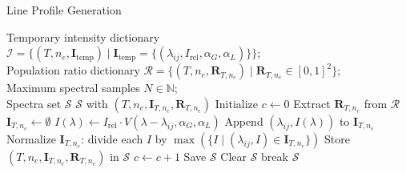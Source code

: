 \begin{algorithm}
\small
\caption{Line Profile Generation}
\begin{algorithmic}[1]
  \REQUIRE 
    Temporary intensity dictionary $\mathcal{I} = \{ (T, n_e, \mathbf{I}_{\text{temp}}) \mid \mathbf{I}_{\text{temp}} = \{ (\lambda_{ij}, I_{\text{rel}}, \alpha_G, \alpha_L) \} \}$; \\
    Population ratio dictionary $\mathcal{R} = \{ (T, n_e, \mathbf{R}_{T,n_e}) \mid \mathbf{R}_{T,n_e} \in [0, 1]^2 \}$; \\
    Maximum spectral samples $N \in \mathbb{N}$; \\
    Spectra set $\mathcal{S}$
  \ENSURE 
    $\mathcal{S}$ with $(T, n_e, \mathbf{I}_{T,n_e}, \mathbf{R}_{T,n_e})$
  \STATE Initialize $c \gets 0$ 
    \STATE Extract $\mathbf{R}_{T,n_e}$ from $\mathcal{R}$ 
    \STATE $\mathbf{I}_{T,n_e} \gets \emptyset$ 
      \STATE $I(\lambda) \gets I_{\text{rel}} \cdot V(\lambda - \lambda_{ij}, \alpha_G, \alpha_L)$ 
      \STATE Append $(\lambda_{ij}, I(\lambda))$ to $\mathbf{I}_{T,n_e}$ 
    \ENDFOR
      \STATE Normalize $\mathbf{I}_{T,n_e}$: divide each $I$ by $\max(\{I \mid (\lambda_{ij}, I) \in \mathbf{I}_{T,n_e}\})$ 
    \ENDIF
    \STATE Store $(T, n_e, \mathbf{I}_{T,n_e}, \mathbf{R}_{T,n_e})$ in $\mathcal{S}$ 
    \STATE $c \gets c + 1$ 
      \STATE Save $\mathcal{S}$ 
      \STATE Clear $\mathcal{S}$ 
    \ENDIF
      \STATE break 
    \ENDIF
  \ENDFOR
  \STATE \RETURN $\mathcal{S}$ 
\end{algorithmic}
\end{algorithm}
